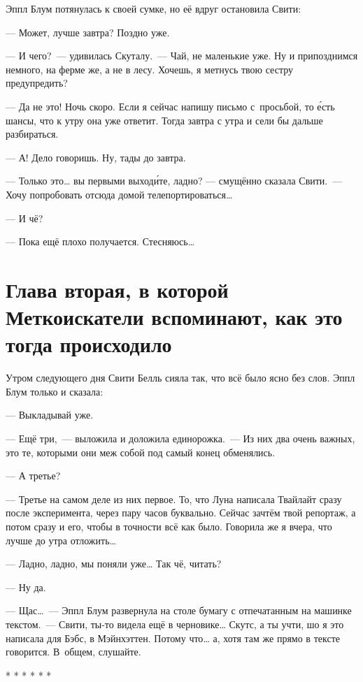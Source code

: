 \documentclass[fontsize=11pt,a5paper,titlepage=firstcover]{scrbook}
\begin{document}
Эппл Блум потянулась к своей сумке, но её вдруг остановила Свити:

--- Может, лучше завтра? Поздно уже.

--- И чего?~--- удивилась Скуталу.~--- Чай, не маленькие уже. Ну и припозднимся немного, на ферме же, а не в лесу. Хочешь, я метнусь твою сестру предупредить?

--- Да не это! Ночь скоро. Если я сейчас напишу письмо с~просьбой, то е́сть шансы, что к утру она уже ответит. Тогда завтра с утра и сели бы дальше разбираться.

--- А! Дело говоришь. Ну, тады до завтра.

--- Только это{\ldots} вы первыми выход\'ите, ладно? --- смущённо сказала Свити.~--- Хочу попробовать отсюда домой телепортироваться{\ldots}

--- И чё?

--- Пока ещё плохо получается. Стесняюсь{\ldots}



\chapter*{Глава вторая, в которой Меткоискатели вспоминают, как это тогда происходило}

Утром следующего дня Свити Белль сияла так, что всё было ясно без слов. Эппл Блум только и сказала:

--- Выкладывай уже.

--- Ещё три,~--- выложила и доложила единорожка.~--- Из них два очень важных, это те, которыми они меж собой под самый конец обменялись.

--- А третье?

--- Третье на самом деле из них первое. То, что Луна написала Твайлайт сразу после эксперимента, через пару часов буквально. Сейчас зачтём твой репортаж, а потом сразу и его, чтобы в точности всё как было. Говорила же я вчера, что лучше до утра отложить{\ldots}

--- Ладно, ладно, мы поняли уже{\ldots} Так чё, читать?

--- Ну да.

--- Щас{\ldots}~--- Эппл Блум развернула на столе бумагу с отпечатанным на машинке текстом.~--- Свити, ты-то видела ещё в черновике{\ldots} Скутс, а ты учти, шо я это написала для Бэбс, в Мэйнхэттен. Потому что{\ldots} а, хотя там же прямо в тексте говорится. В~общем, слушайте.
\begin{center}
	* * * * * *
\end{center}
\end{document}
